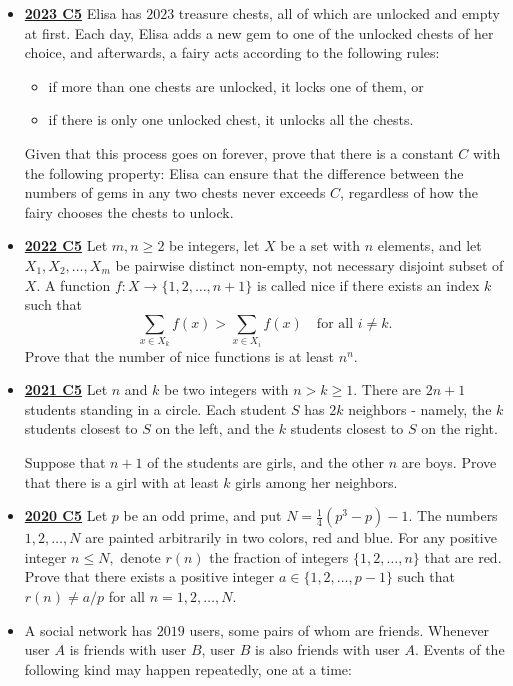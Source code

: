 \documentclass[11pt]{scrartcl}
\begin{document}
\begin{itemize}[leftmargin=*]
Determine all values of $N$ for which Geoff can ensure that he wins, no matter how Ceri plays.
\item \href{https://artofproblemsolving.com/community/c6h3359765p31218619}{\textbf{2023 C5}} Elisa has $2023$ treasure chests, all of which are unlocked and empty at first. Each day, Elisa adds a new gem to one of the unlocked chests of her choice, and afterwards, a fairy acts according to the following rules:
\begin{itemize}[leftmargin=*]
\item[$\bullet$] if more than one chests are unlocked, it locks one of them, or
\item[$\bullet$] if there is only one unlocked chest, it unlocks all the chests.
\end{itemize}
Given that this process goes on forever, prove that there is a constant $C$ with the following property: Elisa can ensure that the difference between the numbers of gems in any two chests never exceeds $C$, regardless of how the fairy chooses the chests to unlock.
    \item  \href{https://artofproblemsolving.com/community/c6h3107370p28104581}{\textbf{2022 C5}}	Let $m,n \geqslant  2$ be integers, let $X$ be a set with $n$ elements, and let $X_1,X_2,\dots,X_m$ be pairwise distinct non-empty, not necessary disjoint subset of $X$. A function $f \colon X \to \{1,2,\dots,n+1\}$ is called nice if there exists an index $k$ such that\[\sum_{x \in X_k} f(x)>\sum_{x \in X_i} f(x) \quad \text{for all } i \ne k.\]Prove that the number of nice functions is at least $n^n$.
    \item \href{https://artofproblemsolving.com/community/c6h2882530p25627454}{\textbf{2021 C5}} 	Let $n$ and $k$ be two integers with $n>k\geqslant  1$. There are $2n+1$ students standing in a circle. Each student $S$ has $2k$ neighbors - namely, the $k$ students closest to $S$ on the left, and the $k$ students closest to $S$ on the right.

Suppose that $n+1$ of the students are girls, and the other $n$ are boys. Prove that there is a girl with at least $k$ girls among her neighbors.
    \item \href{https://artofproblemsolving.com/community/c6h2625882p22698214}{\textbf{2020 C5}} Let $p$ be an odd prime, and put $N=\frac{1}{4} (p^3 -p) -1.$ The numbers $1,2, \dots, N$ are painted arbitrarily in two colors, red and blue. For any positive integer $n \leqslant N,$ denote $r(n)$ the fraction of integers $\{ 1,2, \dots, n \}$ that are red.
Prove that there exists a positive integer $a \in \{ 1,2, \dots, p-1\}$ such that $r(n) \neq a/p$ for all $n = 1,2, \dots , N.$
\newpage
    \item {} A social network has $2019$ users, some pairs of whom are friends. Whenever user $A$ is friends with user $B$, user $B$ is also friends with user $A$. Events of the following kind may happen repeatedly, one at a time:
    

\end{itemize}
\end{document}
